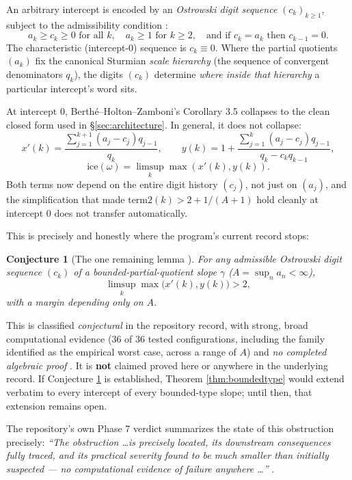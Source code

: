 \documentclass[11pt]{article}
\newtheorem{conjecture}[theorem]{Conjecture}
\begin{document}
An arbitrary intercept is encoded by an \emph{Ostrowski digit sequence} $(c_k)_{k\ge1}$, subject to the admissibility condition \cite{BHZGeneralMap}:
\[
a_k \ge c_k \ge 0 \text{ for all } k,\quad a_k\ge1 \text{ for } k\ge2,\quad \text{and if } c_k=a_k \text{ then } c_{k-1}=0.
\]
The characteristic (intercept-$0$) sequence is $c_k\equiv0$. Where the partial quotients $(a_k)$ fix the canonical Sturmian \emph{scale hierarchy} (the sequence of convergent denominators $q_k$), the digits $(c_k)$ determine \emph{where inside that hierarchy} a particular intercept's word sits.

At intercept $0$, Berthé--Holton--Zamboni's Corollary 3.5 collapses to the clean closed form used in \S\ref{sec:architecture}. In general, it does not collapse:
\[
x'(k) = \frac{\sum_{j=1}^{k+1}(a_j-c_j)q_{j-1}}{q_k}, \qquad
y(k) = 1 + \frac{\sum_{j=1}^{k}(a_j-c_j)q_{j-1}}{q_k-c_kq_{k-1}},
\]
\[
\text{ice}(\omega)=\limsup_k \max(x'(k),y(k)).
\]
Both terms now depend on the entire digit history $(c_j)$, not just on $(a_j)$, and the simplification that made $\text{term2}(k)>2+1/(A+1)$ hold cleanly at intercept $0$ does not transfer automatically.

This is precisely and honestly where the program's current record stops:

\begin{conjecture}[The one remaining lemma \cite{Phase7Verdict}]
\label{conj:phase7}
For any admissible Ostrowski digit sequence $(c_k)$ of a bounded-partial-quotient slope $\gamma$ ($A=\sup_n a_n<\infty$),
\[
\limsup_k \max\bigl(x'(k),y(k)\bigr) > 2,
\]
with a margin depending only on $A$.
\end{conjecture}

This is classified \emph{conjectural} in the repository record, with strong, broad computational evidence ($36$ of $36$ tested configurations, including the family identified as the empirical worst case, across a range of $A$) and \emph{no completed algebraic proof} \cite{Phase7Sufficient}. It is \textbf{not} claimed proved here or anywhere in the underlying record. If Conjecture \ref{conj:phase7} is established, Theorem \ref{thm:boundedtype} would extend verbatim to every intercept of every bounded-type slope; until then, that extension remains open.

The repository's own Phase 7 verdict summarizes the state of this obstruction precisely: \emph{``The obstruction \ldots is precisely located, its downstream consequences fully traced, and its practical severity found to be much smaller than initially suspected --- no computational evidence of failure anywhere \ldots''} \cite{Phase7Verdict}.
\end{document}
